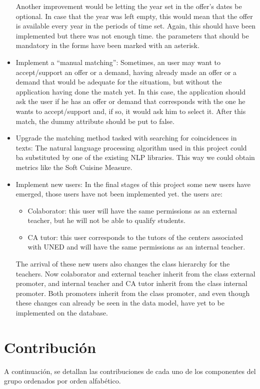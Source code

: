 \documentclass[11pt]{book}
\begin{document}
\begin{itemize}
		Another improvement would be letting the year set in the offer's dates be optional. In case that the year was left empty, this would mean that the offer is available every year in the periods of time set. Again, this should have been implemented but there was not enough time. the parameters that should be mandatory in the forms have been marked with an asterisk.
		\item Implement a ``manual matching'': Sometimes, an user may want to accept/support an offer or a demand, having already made an offer or a demand that would be adequate for the situatiom, but without the application having done the match yet. In this case, the application should ask the user if he has an offer or demand that corresponds with the one he wants to accept/support and, if so, it would ask him to select it. After this match, the dummy attribute should be put to false.
		\item Upgrade the matching method tasked with searching for coincidences in texts: The natural language processing algorithm used in this project could ba substituted by one of the existing NLP libraries. This way we could obtain metrics like the Soft Cuisine Measure.
		\item Implement new users: In the final stages of this project some new users have emerged, those users have not been implemented yet. the users are:
		\begin{itemize}
			\item Colaborator: this user will have the same permissions as an external teacher, but he will not be able to qualify students.
			\item CA tutor: this user corresponds to the tutors of the centers associated with UNED and will have the same permissions as an internal teacher.
		\end{itemize}
The arrival of these new users also changes the class hierarchy for the teachers. Now colaborator and external teacher inherit from the class external promoter, and internal teacher and CA tutor inherit from the class internal promoter. Both promoters inherit from the class promoter, and even though these changes can already be seen in the data model, have yet to be implemented on the database. 
	\end{itemize}
	
	\chapter{Contribución}
	A continuación, se detallan las contribuciones de cada uno de los componentes del grupo ordenados por orden alfabético.
\end{document}
